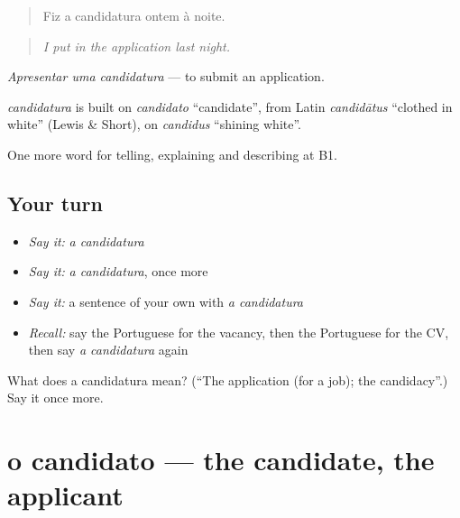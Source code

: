 \begin{quote}
Fiz a candidatura ontem à noite.
\end{quote}

\begin{quote}
\emph{I put in the application last night.}
\end{quote}

\emph{Apresentar uma candidatura} — to submit an application.

\begin{cousinweb}
\emph{candidatura} is built on \emph{candidato} \textquotedblleft{}candidate\textquotedblright{}, from Latin \emph{candidātus} \textquotedblleft{}clothed in white\textquotedblright{} (Lewis \& Short), on \emph{candidus} \textquotedblleft{}shining white\textquotedblright{}.
\end{cousinweb}

\begin{grammarlens}[title={What you've built}]
One more word for telling, explaining and describing at B1.
\end{grammarlens}

\subsection*{Your turn}
\begin{itemize}
\raggedright
  \item \emph{Say it:} \emph{a candidatura}
  \item \emph{Say it:} \emph{a candidatura}, once more
  \item \emph{Say it:} a sentence of your own with \emph{a candidatura}
  \item \emph{Recall:} say the Portuguese for the vacancy, then the Portuguese for the CV, then say \emph{a candidatura} again
\end{itemize}

\begin{tcolorbox}[breakable,colback=teal!4,colframe=teal!35!black,title={Before you move on}]
What does a candidatura mean? (\textquotedblleft{}The application (for a job); the candidacy\textquotedblright{}.) Say it once more.
\end{tcolorbox}
\section[o candidato]{o candidato — the candidate, the applicant}

\label{lesson:PT-C355-candidato}



